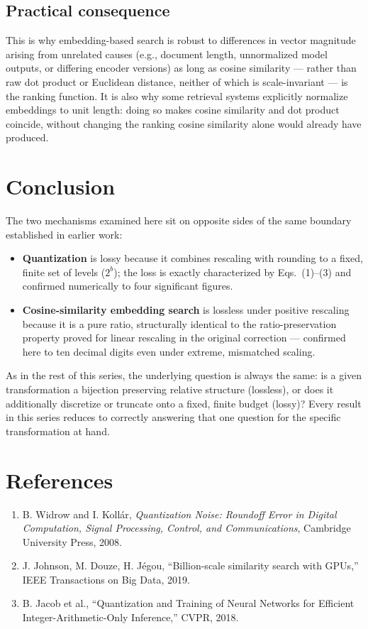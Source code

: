 \documentclass[10pt,journal,compsoc]{IEEEtran}
\begin{document}
\subsection{Practical consequence}
This is why embedding-based search is robust to differences in vector magnitude arising from unrelated causes (e.g., document length, unnormalized model outputs, or differing encoder versions) as long as cosine similarity — rather than raw dot product or Euclidean distance, neither of which is scale-invariant — is the ranking function. It is also why some retrieval systems explicitly normalize embeddings to unit length: doing so makes cosine similarity and dot product coincide, without changing the ranking cosine similarity alone would already have produced.

\section{Conclusion}
The two mechanisms examined here sit on opposite sides of the same boundary established in earlier work:
\begin{itemize}
    \item \textbf{Quantization} is lossy because it combines rescaling with rounding to a fixed, finite set of levels ($2^b$); the loss is exactly characterized by Eqs.~(1)--(3) and confirmed numerically to four significant figures.
    \item \textbf{Cosine-similarity embedding search} is lossless under positive rescaling because it is a pure ratio, structurally identical to the ratio-preservation property proved for linear rescaling in the original correction — confirmed here to ten decimal digits even under extreme, mismatched scaling.
\end{itemize}
As in the rest of this series, the underlying question is always the same: is a given transformation a bijection preserving relative structure (lossless), or does it additionally discretize or truncate onto a fixed, finite budget (lossy)? Every result in this series reduces to correctly answering that one question for the specific transformation at hand.

\section*{References}
\begin{small}
\begin{enumerate}
    \item B. Widrow and I. Kollár, \textit{Quantization Noise: Roundoff Error in Digital Computation, Signal Processing, Control, and Communications}, Cambridge University Press, 2008.
    \item J. Johnson, M. Douze, H. Jégou, ``Billion-scale similarity search with GPUs,'' IEEE Transactions on Big Data, 2019.
    \item B. Jacob et al., ``Quantization and Training of Neural Networks for Efficient Integer-Arithmetic-Only Inference,'' CVPR, 2018.
\end{enumerate}
\end{small}
\end{document}
